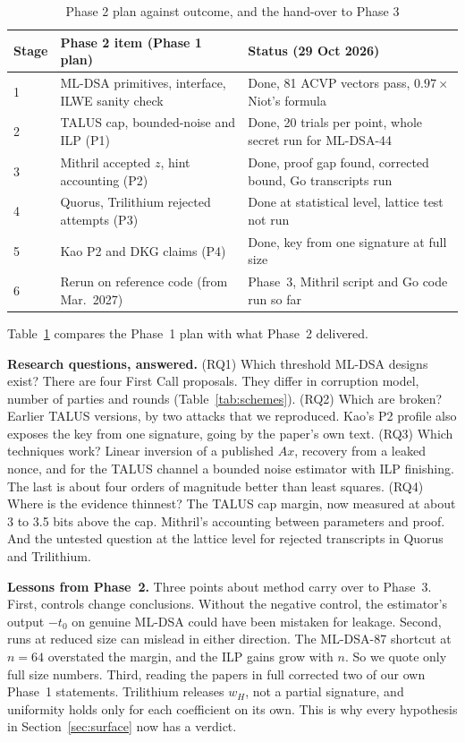 \documentclass[10pt,conference,a4paper]{IEEEtran}
\begin{document}
\begin{table}[t]
\caption{Phase 2 plan against outcome, and the hand-over to Phase 3}\label{tab:plan}
\centering\footnotesize
\begin{tabularx}{\columnwidth}{@{}lXX@{}}
\toprule
Stage & Phase 2 item (Phase 1 plan) & Status (29 Oct 2026)\\
\midrule
1 & ML-DSA primitives, interface, ILWE sanity check & Done, 81 ACVP vectors pass, $0.97\times$ Niot's formula\\
2 & TALUS cap, bounded-noise and ILP (P1) & Done, 20 trials per point, whole secret run for ML-DSA-44\\
3 & Mithril accepted $z$, hint accounting (P2) & Done, proof gap found, corrected bound, Go transcripts run\\
4 & Quorus, Trilithium rejected attempts (P3) & Done at statistical level, lattice test not run\\
5 & Kao P2 and DKG claims (P4) & Done, key from one signature at full size\\
6 & Rerun on reference code (from Mar.\ 2027) & Phase~3, Mithril script and Go code run so far\\
\bottomrule
\end{tabularx}
\end{table}

Table~\ref{tab:plan} compares the Phase~1 plan with what Phase~2 delivered.

\textbf{Research questions, answered.} (RQ1) Which threshold ML-DSA designs exist? There are four First Call proposals.
They differ in corruption model, number of parties and rounds (Table~\ref{tab:schemes}). (RQ2) Which are broken? Earlier
TALUS versions, by two attacks that we reproduced. Kao's P2 profile also exposes the key from one signature, going by the
paper's own text. (RQ3) Which techniques work? Linear inversion of a published $Ax$, recovery from a leaked nonce, and for
the TALUS channel a bounded noise estimator with ILP finishing. The last is about four orders of magnitude better than least
squares. (RQ4) Where is the evidence thinnest? The TALUS cap margin, now measured at about 3 to 3.5 bits above the cap.
Mithril's accounting between parameters and proof. And the untested question at the lattice level for rejected transcripts
in Quorus and Trilithium.

\textbf{Lessons from Phase~2.} Three points about method carry over to Phase~3. First, controls change conclusions. Without
the negative control, the estimator's output $-t_0$ on genuine ML-DSA could have been mistaken for leakage. Second, runs at
reduced size can mislead in either direction. The ML-DSA-87 shortcut at $n=64$ overstated the margin, and the ILP gains grow
with $n$. So we quote only full size numbers. Third, reading the papers in full corrected two of our own Phase~1 statements.
Trilithium releases $w_H$, not a partial signature, and uniformity holds only for each coefficient on its own. This is why
every hypothesis in Section~\ref{sec:surface} now has a verdict.
\end{document}
